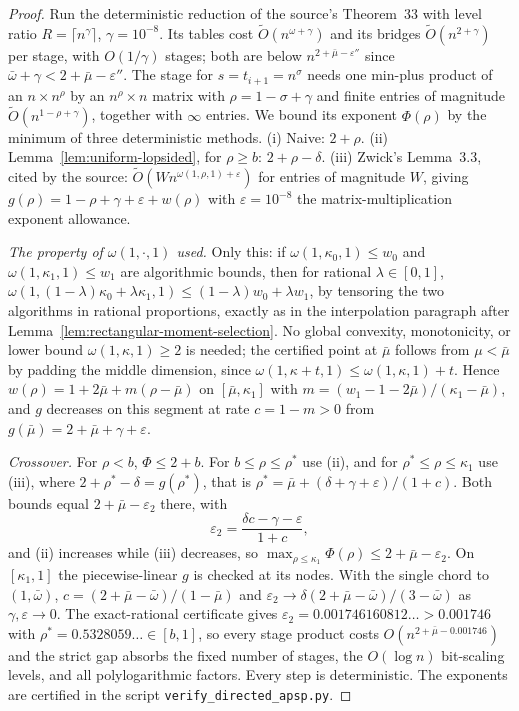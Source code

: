 \documentclass[11pt]{article}
\newcommand{\softO}{\widetilde O}
\begin{document}
\begin{proof}
Run the deterministic reduction of the source's Theorem~33 with level ratio
$R=\lceil n^\gamma\rceil$, $\gamma=10^{-8}$. Its tables cost
$\softO(n^{\omega+\gamma})$ and its bridges $\softO(n^{2+\gamma})$ per
stage, with $O(1/\gamma)$ stages; both are below $n^{2+\bar\mu-\varepsilon''}$
since $\bar\omega+\gamma<2+\bar\mu-\varepsilon''$. The stage for
$s=t_{i+1}=n^{\sigma}$ needs one min-plus product of an $n\times n^\rho$ by
an $n^\rho\times n$ matrix with $\rho=1-\sigma+\gamma$ and finite entries of
magnitude $\softO(n^{1-\rho+\gamma})$, together with $\infty$ entries. We
bound its exponent $\Phi(\rho)$ by the minimum of three deterministic
methods. (i) Naive: $2+\rho$. (ii) Lemma~\ref{lem:uniform-lopsided}, for
$\rho\ge b$: $2+\rho-\delta$. (iii) Zwick's Lemma~3.3, cited by the source:
$\softO(W n^{\omega(1,\rho,1)+\varepsilon})$ for entries of magnitude $W$,
giving $g(\rho)=1-\rho+\gamma+\varepsilon+w(\rho)$ with
$\varepsilon=10^{-8}$ the matrix-multiplication exponent allowance.

\emph{The property of $\omega(1,\cdot,1)$ used.} Only this: if
$\omega(1,\kappa_0,1)\le w_0$ and $\omega(1,\kappa_1,1)\le w_1$ are
algorithmic bounds, then for rational $\lambda\in[0,1]$,
$\omega(1,(1-\lambda)\kappa_0+\lambda\kappa_1,1)\le(1-\lambda)w_0+\lambda w_1$,
by tensoring the two algorithms in rational proportions, exactly as in the
interpolation paragraph after Lemma~\ref{lem:rectangular-moment-selection}.
No global convexity, monotonicity, or lower bound $\omega(1,\kappa,1)\ge2$ is
needed; the certified point at $\bar\mu$ follows from $\mu<\bar\mu$ by
padding the middle dimension, since $\omega(1,\kappa+t,1)\le\omega(1,\kappa,1)+t$.
Hence $w(\rho)=1+2\bar\mu+m(\rho-\bar\mu)$ on $[\bar\mu,\kappa_1]$ with
$m=(w_1-1-2\bar\mu)/(\kappa_1-\bar\mu)$, and $g$ decreases on this segment at
rate $c=1-m>0$ from $g(\bar\mu)=2+\bar\mu+\gamma+\varepsilon$.

\emph{Crossover.} For $\rho<b$, $\Phi\le2+b$. For $b\le\rho\le\rho^*$ use
(ii), and for $\rho^*\le\rho\le\kappa_1$ use (iii), where
$2+\rho^*-\delta=g(\rho^*)$, that is
$\rho^*=\bar\mu+(\delta+\gamma+\varepsilon)/(1+c)$. Both bounds equal
$2+\bar\mu-\varepsilon_2$ there, with
\[
\varepsilon_2=\frac{\delta c-\gamma-\varepsilon}{1+c},
\]
and (ii) increases while (iii) decreases, so
$\max_{\rho\le\kappa_1}\Phi(\rho)\le2+\bar\mu-\varepsilon_2$. On
$[\kappa_1,1]$ the piecewise-linear $g$ is checked at its nodes. With the
single chord to $(1,\bar\omega)$, $c=(2+\bar\mu-\bar\omega)/(1-\bar\mu)$ and
$\varepsilon_2\to\delta(2+\bar\mu-\bar\omega)/(3-\bar\omega)$ as
$\gamma,\varepsilon\to0$. The exact-rational certificate gives
$\varepsilon_2=0.001746160812\ldots>0.001746$ with
$\rho^*=0.5328059\ldots\in[b,1]$, so every stage product costs
$O(n^{2+\bar\mu-0.001746})$ and the strict gap absorbs the fixed number of
stages, the $O(\log n)$ bit-scaling levels, and all polylogarithmic
factors. Every step is deterministic. The exponents are certified in the script
\texttt{verify\_\allowbreak directed\_\allowbreak apsp.py}.
\end{proof}
\end{document}
